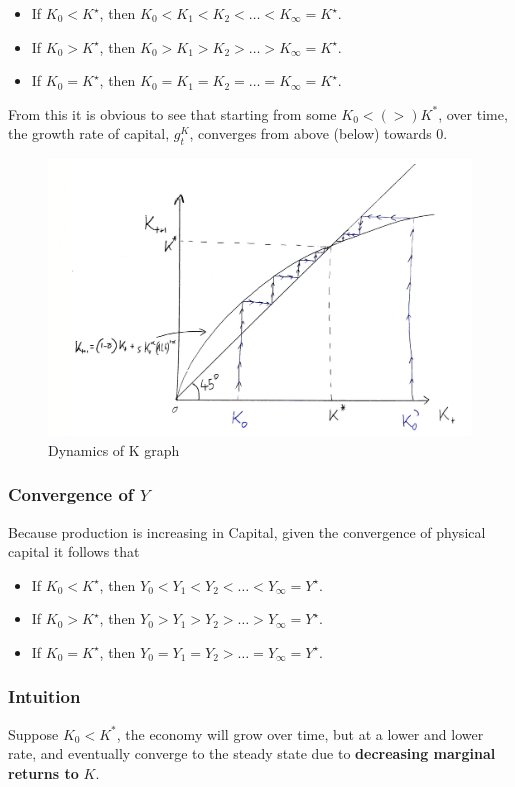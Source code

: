 \documentclass[11pt]{article}
\begin{document}
\begin{itemize}
    \item If $K_0<K^{\star}$, then $K_0<K_1<K_2<\ldots<K_{\infty}=K^{\star}$.
    \item If $K_0>K^{\star}$, then $K_0>K_1>K_2>\ldots>K_{\infty}=K^{\star}$.
    \item If $K_0=K^{\star}$, then $K_0=K_1=K_2=\ldots=K_{\infty}=K^{\star}$.
\end{itemize}

From this it is obvious to see that starting from some $K_0<(>)K^*$, over time, the growth rate of capital, $g_t^K$, converges from above (below) towards 0.
\clearpage
\begin{figure}[h]
    \centering
    \includegraphics[width=12cm]{photos/dynamics of K.png}
    \caption{Dynamics of K graph}
    \label{fig:dynamics of K}
\end{figure}

\subsubsection{Convergence of $Y$}

Because production is increasing in Capital, given the convergence of physical capital it follows that 

\begin{itemize}
    \item If $K_0<K^{\star}$, then $Y_0<Y_1<Y_2<\ldots<Y_{\infty}=Y^{\star}$.
    \item If $K_0>K^{\star}$, then $Y_0>Y_1>Y_2>\ldots>Y_{\infty}=Y^{\star}$.
    \item If $K_0=K^{\star}$, then $Y_0=Y_1=Y_2>\ldots=Y_{\infty}=Y^{\star}$.
\end{itemize}

\subsubsection{Intuition}
Suppose $K_0<K^*$, the economy will grow over time, but at a lower and lower rate, and eventually converge to the steady state due to \textbf{decreasing marginal returns to} $K$.\\
\end{document}
